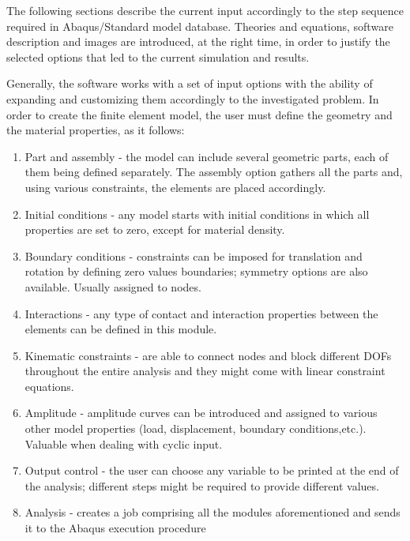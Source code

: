 \documentclass[11pt,a4paper]{report}
\begin{document}
The following sections describe the current input accordingly to the step sequence required in Abaqus/Standard model database. Theories and equations, software description and images are introduced, at the right time, in order to justify the selected options that led to the current simulation and results.

Generally, the software works with a set of input options with the ability of expanding and customizing them accordingly to the investigated problem. In order to create the finite element model, the user must define the geometry and the material properties, as it follows:
\begin{enumerate}
	\item Part and assembly - the model can include several geometric parts, each of them being defined separately. The assembly option gathers all the parts and, using various constraints, the elements are placed accordingly.
	\item Initial conditions - any model starts with initial conditions in which all properties are set to zero, except for material density.  
	\item Boundary conditions - constraints can be imposed for translation and rotation by defining zero values boundaries; symmetry options are also available. Usually assigned to nodes.
	\item Interactions - any type of contact and interaction properties between the elements can be defined in this module.
	\item Kinematic constraints - are able to connect nodes and block different DOFs throughout the entire analysis and they might come with linear constraint equations. 
	\item Amplitude - amplitude curves can be introduced and assigned to various other model properties (load, displacement, boundary conditions,etc.). Valuable when dealing with cyclic input.
	\item Output control - the user can choose any variable to be printed at the end of the analysis; different steps might be required to provide different values. 
	\item Analysis - creates a job comprising all the modules aforementioned and sends it to the Abaqus execution procedure 
\end{enumerate} 

\newpage
\end{document}
